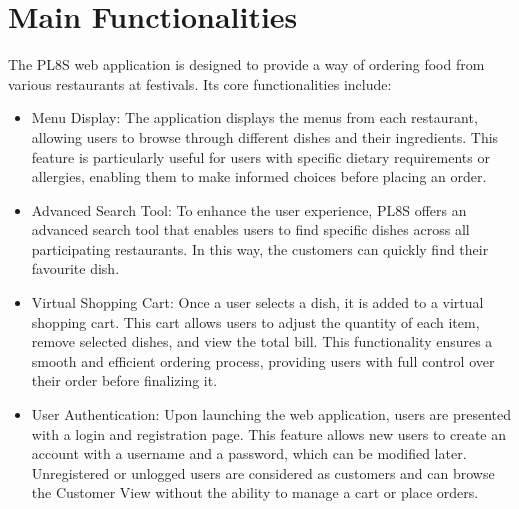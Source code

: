 \section{Main Functionalities}

The PL8S web application is designed to provide a way of ordering food from various restaurants at festivals. Its core functionalities include:

\begin{itemize}

	\item Menu Display: The application displays the menus from each restaurant, allowing users to browse through different dishes and their ingredients. This feature is particularly useful for users with specific dietary requirements or allergies, enabling them to make informed choices before placing an order. 

	\item Advanced Search Tool: To enhance the user experience, PL8S offers an advanced search tool that enables users to find specific dishes across all participating restaurants. In this way, the customers can quickly find their favourite dish.
	
	\item Virtual Shopping Cart: Once a user selects a dish, it is added to a virtual shopping cart. This cart allows users to adjust the quantity of each item, remove selected dishes, and view the total bill. This functionality ensures a smooth and efficient ordering process, providing users with full control over their order before finalizing it.
	
	\item User Authentication: Upon launching the web application, users are presented with a login and registration page. This feature allows new users to create an account with a username and a password, which can be modified later. Unregistered or unlogged users are considered as customers and can browse the Customer View without the ability to manage a cart or place orders.

\end{itemize}


